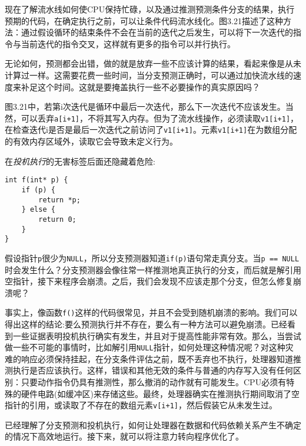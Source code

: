 

现在了解流水线如何使CPU保持忙碌，以及通过推测预测条件分支的结果，执行预期的代码，在确定执行之前，可以让条件代码流水线化。图3.21描述了这种方法：通过假设循环的结束条件不会在当前的迭代之后发生，可以将下一次迭代的指令与当前迭代的指令交叉，这样就有更多的指令可以并行执行。

无论如何，预测都会出错，做的就是放弃一些不应该计算的结果，看起来像是从未计算过一样。这需要花费一些时间，当分支预测正确时，可以通过加快流水线的速度来补足这个时间。这就是要掩盖执行一些不必要操作的真实原因吗？

图3.21中，若第i次迭代是循环中最后一次迭代，那么下一次迭代不应该发生。当然，可以丢弃\texttt{a[i+1]}，不将其写入内存。但为了流水线操作，必须读取\texttt{v1[i+1]}，在检查迭代i是否是最后一次迭代之前访问了\texttt{v1[i+1]}。元素\texttt{v1[i+1]}在为数组分配的有效内存区域外，读取它会导致未定义行为。

在\textit{投机执行}的无害标签后面还隐藏着危险:

\begin{lstlisting}[style=styleCXX]
int f(int* p) {
	if (p) {
		return *p;
	} else {
		return 0;
	}
}
\end{lstlisting}

假设指针\texttt{p}很少为\texttt{NULL}，所以分支预测器知道\texttt{if(p)}语句常走真分支。当\texttt{p == NULL}时会发生什么？分支预测器会像往常一样推测地真正执行的分支，而后就是解引用空指针，接下来程序会崩溃。之后，我们会发现不应该走那个分支，但怎么修复崩溃呢？

事实上，像函数\texttt{f()}这样的代码很常见，并且不会受到随机崩溃的影响。我们可以得出这样的结论:要么预测执行并不存在，要么有一种方法可以避免崩溃。已经看到一些证据表明投机执行确实有发生，并且对于提高性能非常有效。那么，当尝试做一些不可能的事情时，比如解引用\texttt{NULL}指针，如何处理这种情况呢？对这种灾难的响应必须保持挂起，在分支条件评估之前，既不丢弃也不执行，处理器知道推测执行是否应该执行。这样，错误和其他无效的条件与普通的内存写入没有任何区别：只要动作指令仍具有推测性，那么撤消的动作就有可能发生。CPU必须有特殊的硬件电路(如缓冲区)来存储这些。最终，处理器确实在推测执行期间取消了空指针的引用，或读取了不存在的数组元素\texttt{v[i+1]}，然后假装它从未发生过。

已经理解了分支预测和投机执行，如何让处理器在数据和代码依赖关系产生不确定的情况下高效地运行。接下来，就可以将注意力转向程序优化了。





























































